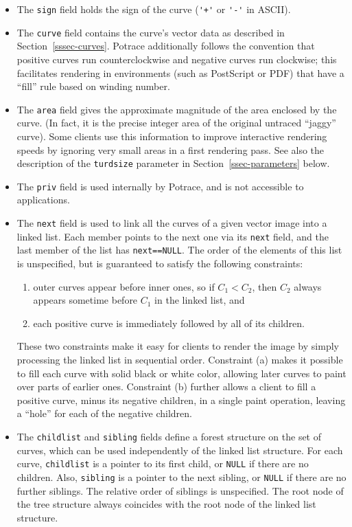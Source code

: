 \documentclass{article}
\makeatletter
\gdef\alphalabels{\def\theenumi{\@alph\c@enumi}\def\labelenumi{(\theenumi)}}}
\makeatother
\begin{document}
\begin{itemize}

\item The \verb!sign! field holds the sign of the curve (\verb!'+'! or
  \verb!'-'! in ASCII).

\item The \verb!curve! field contains the curve's vector data as
  described in Section~\ref{sssec-curves}. Potrace additionally
  follows the convention that positive curves run counterclockwise and
  negative curves run clockwise; this facilitates rendering in
  environments (such as PostScript or PDF) that have a ``fill'' rule
  based on winding number.

\item The \verb!area! field gives the approximate magnitude of the
  area enclosed by the curve. (In fact, it is the precise integer area
  of the original untraced ``jaggy'' curve). Some clients use this
  information to improve interactive rendering speeds by ignoring very
  small areas in a first rendering pass. See also the description of
  the \verb!turdsize!  parameter in Section~\ref{ssec-parameters} below.
  
\item The \verb!priv!  field is used internally by Potrace, and is not
  accessible to applications.

\item The \verb!next! field is used to link all the curves of a given
  vector image into a linked list. Each member points to the next one
  via its \verb!next! field, and the last member of the list has
  \verb!next==NULL!.  The order of the elements of this list is
  unspecified, but is guaranteed to satisfy the following constraints:
  \begin{enumerate}\alphalabels
  \item outer curves appear before inner ones, so if $C_1 < C_2$, then
    $C_2$ always appears sometime before $C_1$ in the linked list, and
  \item each positive curve is immediately followed by all of its
    children.
  \end{enumerate}
  These two constraints make it easy for clients to render the image
  by simply processing the linked list in sequential order.
  Constraint (a) makes it possible to fill each curve with solid black
  or white color, allowing later curves to paint over parts of earlier
  ones.  Constraint (b) further allows a client to fill a positive
  curve, minus its negative children, in a single paint operation,
  leaving a ``hole'' for each of the negative children.

\item The \verb!childlist! and \verb!sibling! fields define a forest
  structure on the set of curves, which can be used independently of
  the linked list structure.  For each curve, \verb!childlist! is a
  pointer to its first child, or \verb!NULL! if there are no children.
  Also, \verb!sibling! is a pointer to the next sibling, or
  \verb!NULL!  if there are no further siblings.  The relative order
  of siblings is unspecified. The root node of the tree structure
  always coincides with the root node of the linked list structure.
\end{itemize}
\end{document}
